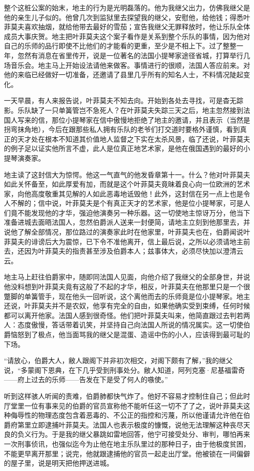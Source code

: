 \documentclass[12pt, UTF8]{ctexbook}
\begin{document}
\par 整个这桩公案的始末，地主的行为是光明磊落的。他为我继父出力，仿佛我继父是他的亲生儿子似的。他曾几次到监狱里去探望我的继父，安慰他，给他钱；得悉叶菲莫夫喜欢抽烟，就给他带去最好的雪茄；宣告我继父无罪释放时，他让乐队全体成员大事庆贺。地主把叶菲莫夫这个案子看作是关系到整个乐队的事情，因为他对自己的乐师的品行即使不比他们的才能看的更重，至少是不相上下。过了整整一年，忽然有消息在省里传开，说是一位著名的法国小提琴家途径省城，打算举行几场音乐会。地主马上开始设法请他来做客。事情进行的很顺，法国人答应前来。对他的来临已经做好一切准备，还邀请了县里几乎所有的知名人士，不料情况陡起变化。
\par 一天早晨，有人来报告说，叶菲莫夫不知去向。开始到各处去寻找，可是杳无踪影。乐队缺了一只单簧管岂不急死人？在叶菲莫夫失踪三天之后，地主忽然接到法国人写来的信，那位小提琴家在信中傲慢地拒绝了地主的邀请，并且表示（当然是拐弯抹角地），今后在跟那些私人拥有乐队的老爷们打交道时要格外谨慎，看到真正的天才处在根本不知道其价值地人监督之下实在太杀风景，临了还说，叶菲莫夫的例子足以证实他所言不虚，此人是位真正地艺术家，是他在俄国遇到的最好的小提琴演奏家。
\par 地主读了这封信大为惊愕。他这一气直气的他发昏章第十一。什么？他对叶菲莫夫如此关怀备至，如此厚爱有加，而就是这个叶菲莫夫竟昧着良心向一位欧洲的艺术家，向他高度敬重其见解的人如此恶毒地诋毁他！此外，这封信在另一点上也是令人不解的；信中说，叶菲莫夫是个有真正天才的艺术家，他是位小提琴家，可是人们竟不能发现他的才华，强迫他演奏另一种乐器。这一切使地主惊讶万分，他当下准备进城去面晤法国人，忽然伯爵派人送来一封便简，请地主立刻到他那里去，并说他了解全部情况，那位路过的演奏家此时在他家里，叶菲莫夫也在，伯爵闻说叶菲莫夫的诽谤后大为震惊，已下令不准他离开，信上最后说，之所以必须请地主前去，还因为叶菲莫夫的指责甚至涉及伯爵本人；兹事体大，必须尽快加以澄清云云。
\par 地主马上赶往伯爵家中，随即同法国人见面，向他介绍了我继父的全部身世，并说他没料想到叶菲莫夫竟有这般了不起的才华，相反，叶菲莫夫在他那里只是一个很蹩脚的单簧管手，现在他头一回听说，这个离他而去的乐师竟是位小提琴家。地主还说，叶菲莫夫并不是农奴，他享有完全的自由，如果他确实受到束缚，任何时候都可以离开他家。法国人感到很奇怪。他们把叶菲莫夫叫来，他简直跟过去判若两人：态度傲慢，答话带着讥笑，并坚持自己向法国人所说的情况属实。这一切使伯爵恼怒到了极点，他当面骂我的继父是混蛋、造谣中伤的小人，应该得到最可耻的下场。
\par “请放心，伯爵大人，敝人跟阁下并非初次相交，对阁下颇有了解，”我的继父说，“多蒙阁下恩典，在下几乎受到刑事处分。敝人知道，阿列克塞·尼基福雷奇——府上过去的乐师——告发在下是受了何人的嗾使。”
\par 听到这样骇人听闻的责难，伯爵肺都快气炸了。他好不容易才控制住自己；但此时厅堂里一位有事来见的伯爵的官员宣称他不能听任这一切不了了之，说叶菲莫夫这种侮辱性的物理态度包含着恶毒的、不公正的指控和污蔑，所以他谨请允许他在伯爵府第里立即逮捕叶菲莫夫。法国人也表示极度的慷慨，说他无法理解这种丧尽天良的负义行为。于是我的继父暴跳如雷地回答，他宁可接受处分、审判，哪怕再来一次刑事侦讯，也强似迄今为止他在地主乐队里过的那种日子，由于他极度贫困，不能更早离开那里；说完，他就跟逮捕他的官员一起走出厅堂。他被锁在一间偏僻的屋子里，说是明天把他押送进城。
\end{document}
